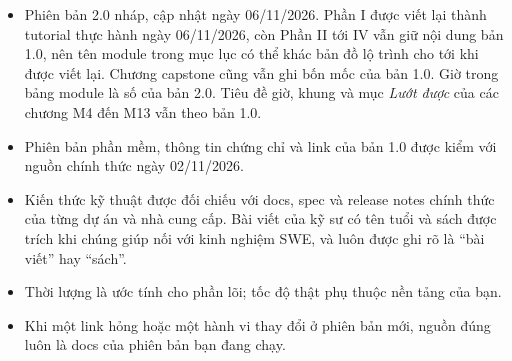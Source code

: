 \documentclass[11pt,a4paper,oneside]{report}
\begin{document}
\begin{itemize}
  \item Phiên bản 2.0 nháp, cập nhật ngày 06/11/2026. Phần I được viết lại thành tutorial thực hành ngày 06/11/2026, còn Phần II tới IV vẫn giữ nội dung bản 1.0, nên tên module trong mục lục có thể khác bản đồ lộ trình cho tới khi được viết lại. Chương capstone cũng vẫn ghi bốn mốc của bản 1.0. Giờ trong bảng module là số của bản 2.0. Tiêu đề giờ, khung và mục \textit{Lướt được} của các chương M4 đến M13 vẫn theo bản 1.0.
  \item Phiên bản phần mềm, thông tin chứng chỉ và link của bản 1.0 được kiểm với nguồn chính thức ngày 02/11/2026.
  \item Kiến thức kỹ thuật được đối chiếu với docs, spec và release notes chính thức của từng dự án và nhà cung cấp. Bài viết của kỹ sư có tên tuổi và sách được trích khi chúng giúp nối với kinh nghiệm SWE, và luôn được ghi rõ là ``bài viết'' hay ``sách''.
  \item Thời lượng là ước tính cho phần lõi; tốc độ thật phụ thuộc nền tảng của bạn.
  \item Khi một link hỏng hoặc một hành vi thay đổi ở phiên bản mới, nguồn đúng luôn là docs của phiên bản bạn đang chạy.
\end{itemize}
\end{document}
